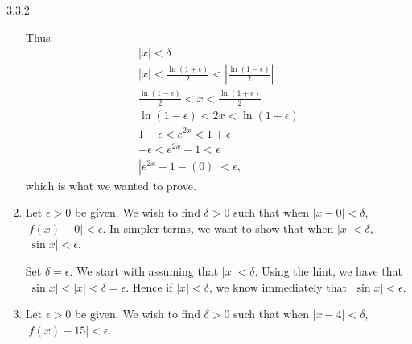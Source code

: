 \begin{Answer}{3.3.2}
\begin{enumerate}
{Thus:
\begin{gather*}
|x| < \delta \\
|x| <\frac{\ln(1+\epsilon)}{2}<\left|\frac{\ln(1-\epsilon)}{2}\right| \\
\frac{\ln(1-\epsilon)}{2} < x < \frac{\ln(1+\epsilon)}{2}\\
\ln(1-\epsilon)< 2x < \ln(1+\epsilon)\\
1-\epsilon < e^{2x} < 1+\epsilon\\
-\epsilon < e^{2x}-1 < \epsilon\\
|e^{2x}-1-(0)| < \epsilon,
\end{gather*}
which is what we wanted to prove.
}
\item
{Let $\epsilon >0$ be given. We wish to find $\delta >0$ such that when $|x-0|<\delta$, $|f(x)-0|<\epsilon$. In simpler terms, we want to show that when $|x|<\delta$, $|\sin x| < \epsilon$.

Set $\delta = \epsilon$. We start with assuming that $|x|<\delta$. Using the hint, we have that $|\sin x | < |x| < \delta = \epsilon$. Hence if $|x|<\delta$, we know immediately that $|\sin x| < \epsilon$.
}
\item {Let $\epsilon >0$ be given. We wish to find $\delta >0$ such that when $|x-4|<\delta$, $|f(x)-15|<\epsilon$.

}
\end{enumerate}
\end{Answer}
